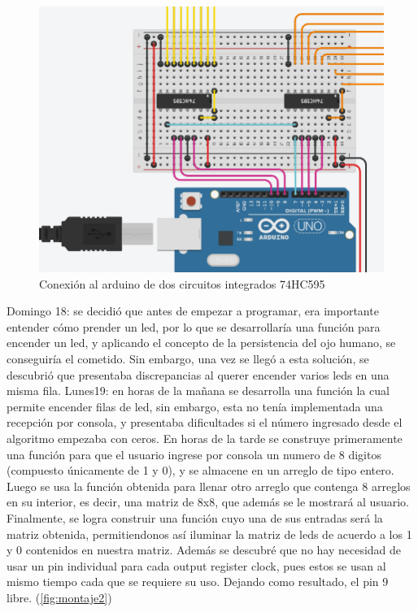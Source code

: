 \documentclass{article}
\begin{document}
\begin{figure}[h]
\includegraphics[scale=0.5]{pinesarduino.png}
\centering
\caption{Conexión al arduino de dos circuitos integrados 74HC595}
\label{fig:pinesarduinos}
\end{figure}

Domingo 18: se decidió que antes de empezar a programar, era importante entender cómo prender un led, por lo que se desarrollaría una función para encender un led, y aplicando el concepto de la persistencia del ojo humano, se conseguiría el cometido. Sin embargo, una vez se llegó a esta solución, se descubrió que presentaba discrepancias al querer encender varios leds en una misma fila. 
\newline
Lunes19: en horas de la mañana se desarrolla una función la cual permite encender filas de led, sin embargo, esta no tenía implementada una recepción por consola, y presentaba dificultades si el número ingresado desde el algoritmo empezaba con ceros.
 En horas de la tarde se construye primeramente una función para que el usuario ingrese por consola un numero de 8 digitos (compuesto únicamente de 1 y 0), y se almacene en un arreglo de tipo entero. Luego se usa la función obtenida para  llenar otro arreglo que contenga 8 arreglos en su interior, es decir, una matriz de 8x8, que además se le mostrará al usuario.
 Finalmente, se logra construir una función cuyo una de sus entradas será la matriz obtenida, permitiendonos así iluminar la matriz de leds de acuerdo a los 1 y 0 contenidos en nuestra matriz.
 Además se descubré que no hay necesidad de usar un pin individual para cada output register clock, pues estos se usan al mismo tiempo cada que se requiere su uso. Dejando como resultado, el pin 9 libre. (\ref{fig:montaje2})
 
\end{document}
